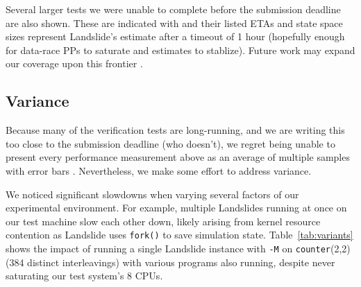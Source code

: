 \documentclass[10pt]{sigplanconf}
\begin{document}
Several larger tests we were unable to complete before the submission deadline are also shown.
These are indicated with \ETAdag{}
and their listed ETAs and state space sizes represent Landslide's estimate %
after a timeout of 1 hour
(hopefully enough for data-race PPs to saturate and estimates to stablize).
Future work may expand our coverage upon this frontier \cite{landslide-phdthesis}.

\subsection{Variance}

Because many of the verification tests are long-running,
and we are writing this too close to the submission deadline (who doesn't),
we regret being unable to present every performance measurement above
as an average of multiple samples with error bars \cite{epsilon}.
Nevertheless, we make some effort to address variance.

We noticed significant slowdowns when varying several factors of our experimental environment.
For example, multiple Landslides running at once on our test machine slow each other down,
likely arising from kernel resource contention as Landslide uses {\tt fork()} to save simulation state.
Table~\ref{tab:variants} shows the impact of running a single Landslide instance with {\tt -M} on
{\tt counter}(2,2) (384 distinct interleavings)
with various programs also running, despite never saturating our test system's 8 CPUs.
\end{document}
